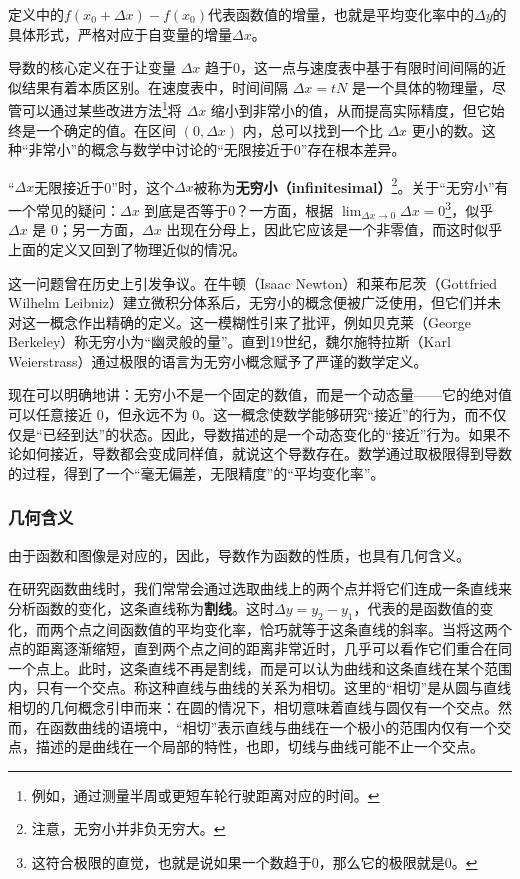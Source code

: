 定义中的$f(x_0+\Delta x)-f(x_0)$代表函数值的增量，也就是平均变化率中的$\Delta y$的具体形式，严格对应于自变量的增量$\Delta x$。

导数的核心定义在于让变量 $\Delta x$ 趋于0，这一点与速度表中基于有限时间间隔的近似结果有着本质区别。在速度表中，时间间隔 $\Delta x = tN$ 是一个具体的物理量，尽管可以通过某些改进方法\footnote{例如，通过测量半周或更短车轮行驶距离对应的时间。}将 $\Delta x$ 缩小到非常小的值，从而提高实际精度，但它始终是一个确定的值。在区间 $(0, \Delta x)$ 内，总可以找到一个比 $\Delta x$ 更小的数。这种“非常小”的概念与数学中讨论的“无限接近于0”存在根本差异。

“$\Delta x$无限接近于0”时，这个$\Delta x$被称为\textbf{无穷小（infinitesimal）}\footnote{注意，无穷小并非负无穷大。}。关于“无穷小”有一个常见的疑问：$\Delta x$ 到底是否等于0？一方面，根据 $\displaystyle\lim_{\Delta x \to 0} \Delta x = 0$\footnote{这符合极限的直觉，也就是说如果一个数趋于0，那么它的极限就是0。}，似乎 $\Delta x$ 是 0；另一方面，$\Delta x$ 出现在分母上，因此它应该是一个非零值，而这时似乎上面的定义又回到了物理近似的情况。

这一问题曾在历史上引发争议。在牛顿（Isaac Newton）和莱布尼茨（Gottfried Wilhelm Leibniz）建立微积分体系后，无穷小的概念便被广泛使用，但它们并未对这一概念作出精确的定义。这一模糊性引来了批评，例如贝克莱（George Berkeley）称无穷小为“幽灵般的量”。直到19世纪，魏尔施特拉斯（Karl Weierstrass）通过极限的语言为无穷小概念赋予了严谨的数学定义。

现在可以明确地讲：无穷小不是一个固定的数值，而是一个动态量——它的绝对值可以任意接近 0，但永远不为 0。这一概念使数学能够研究“接近”的行为，而不仅仅是“已经到达”的状态。因此，导数描述的是一个动态变化的“接近”行为。如果不论如何接近，导数都会变成同样值，就说这个导数存在。数学通过取极限得到导数的过程，得到了一个“毫无偏差，无限精度”的“平均变化率”。

\subsubsection{几何含义}

由于函数和图像是对应的，因此，导数作为函数的性质，也具有几何含义。

在研究函数曲线时，我们常常会通过选取曲线上的两个点并将它们连成一条直线来分析函数的变化，这条直线称为\textbf{割线}。这时$\Delta y=y_2-y_1$，代表的是函数值的变化，而两个点之间函数值的平均变化率，恰巧就等于这条直线的斜率。当将这两个点的距离逐渐缩短，直到两个点之间的距离非常近时，几乎可以看作它们重合在同一个点上。此时，这条直线不再是割线，而是可以认为曲线和这条直线在某个范围内，只有一个交点。称这种直线与曲线的关系为相切。这里的“相切”是从圆与直线相切的几何概念引申而来：在圆的情况下，相切意味着直线与圆仅有一个交点。然而，在函数曲线的语境中，“相切”表示直线与曲线在一个极小的范围内仅有一个交点，描述的是曲线在一个局部的特性，也即，切线与曲线可能不止一个交点。

